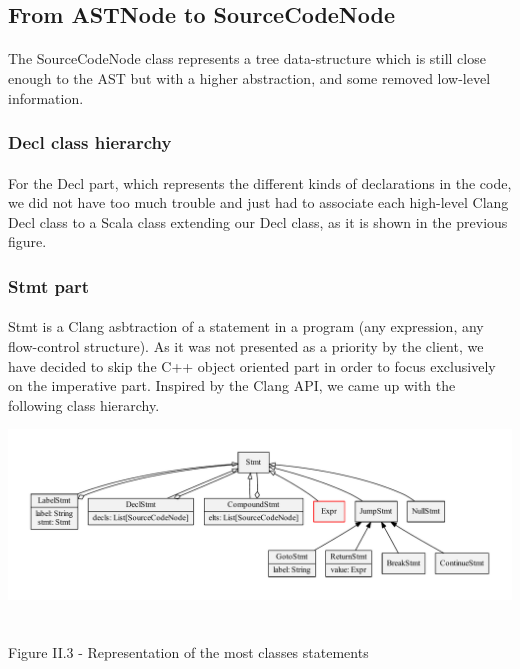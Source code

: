 \documentclass{report}
\begin{document}
\subsection{From ASTNode to SourceCodeNode}

\paragraph{}
\hspace{4mm}The SourceCodeNode class represents a tree data-structure which is still close enough to the AST 
but with a higher abstraction, and some removed low-level information.

\subsubsection{Decl class hierarchy}

\paragraph{}
\hspace{4mm}For the Decl part,  which represents the different kinds of declarations in the code, we did not have too much trouble and just had to associate each high-level Clang Decl class to a Scala class extending
our Decl class, as it is shown in the previous figure.

\subsubsection{Stmt part}

\paragraph{}
\hspace{4mm}Stmt is a Clang asbtraction of a statement in a program (any expression, any flow-control structure). As it was not presented as a priority by the client, we have decided to skip the C++ object oriented 
part in order to focus exclusively on the imperative part. Inspired by the Clang API, we came up
 with the following class hierarchy.

\begin{center}
\includegraphics[scale=0.5]{data/basic_Stmt_classes}
~\\~\\Figure II.3 - Representation of the most classes statements
\end{center}
\end{document}
